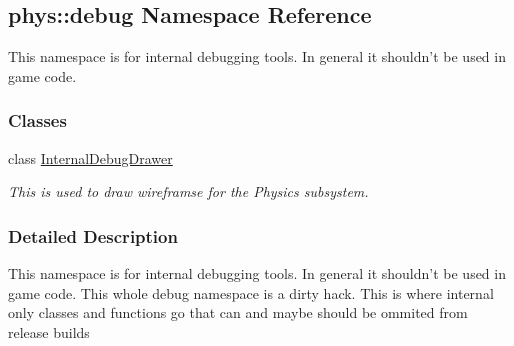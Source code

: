 \hypertarget{namespacephys_1_1debug}{
\subsection{phys::debug Namespace Reference}
\label{namespacephys_1_1debug}
}


This namespace is for internal debugging tools. In general it shouldn't be used in game code.  


\subsubsection*{Classes}
\begin{DoxyCompactItemize}
\item 
class \hyperlink{classphys_1_1debug_1_1InternalDebugDrawer}{InternalDebugDrawer}
\begin{DoxyCompactList}\small\item\em This is used to draw wireframse for the Physics subsystem. \item\end{DoxyCompactList}\end{DoxyCompactItemize}


\subsubsection{Detailed Description}
This namespace is for internal debugging tools. In general it shouldn't be used in game code. This whole debug namespace is a dirty hack. This is where internal only classes and functions go that can and maybe should be ommited from release builds 
